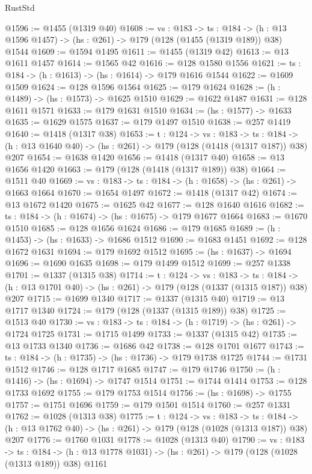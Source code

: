 \begin{lexlean}{RustStd}
\begin{coremodule}
{\begin{coremodule}
{{{{@1596 := @1455 (@1319 @40)
@1608 := {vs : @183} ->
  {ts : @184} -> (h : @13 @1596 @1457) -> (hs : @261) -> @179 (@128 (@1455 (@1319 @189)) @38) @1544
@1609 := @1594 @1495
@1611 := @1455 (@1319 @42)
@1613 := @13 @1611 @1457
@1614 := @1565 @42
@1616 := @128 @1580 @1556
@1621 := {ts : @184} -> (h : @1613) -> (hs : @1614) -> @179 @1616 @1544
@1622 := @1609 @1509
@1624 := @128 @1596 @1564
@1625 := @179 @1624
@1628 := (h : @1489) -> (hs : @1573) -> @1625 @1510
@1629 := @1622 @1487
@1631 := @128 @1611 @1571
@1633 := @179 @1631 @1510
@1634 := (hs : @1577) -> @1633
@1635 := @1629 @1575
@1637 := @179 @1497 @1510
@1638 := @257 @1419
@1640 := @1418 (@1317 @38)
@1653 := {t : @124} ->
  {vs : @183} ->
  {ts : @184} -> (h : @13 @1640 @40) -> (hs : @261) -> @179 (@128 (@1418 (@1317 @187)) @38) @207
@1654 := @1638 @1420
@1656 := @1418 (@1317 @40)
@1658 := @13 @1656 @1420
@1663 := @179 (@128 (@1418 (@1317 @189)) @38)
@1664 := @1511 @40
@1669 := {vs : @183} -> {ts : @184} -> (h : @1658) -> (hs : @261) -> @1663 @1664
@1670 := @1654 @1497
@1672 := @1418 (@1317 @42)
@1674 := @13 @1672 @1420
@1675 := @1625 @42
@1677 := @128 @1640 @1616
@1682 := {ts : @184} -> (h : @1674) -> (hs : @1675) -> @179 @1677 @1664
@1683 := @1670 @1510
@1685 := @128 @1656 @1624
@1686 := @179 @1685
@1689 := (h : @1453) -> (hs : @1633) -> @1686 @1512
@1690 := @1683 @1451
@1692 := @128 @1672 @1631
@1694 := @179 @1692 @1512
@1695 := (hs : @1637) -> @1694
@1696 := @1690 @1635
@1698 := @179 @1499 @1512
@1699 := @257 @1338
@1701 := @1337 (@1315 @38)
@1714 := {t : @124} ->
  {vs : @183} ->
  {ts : @184} -> (h : @13 @1701 @40) -> (hs : @261) -> @179 (@128 (@1337 (@1315 @187)) @38) @207
@1715 := @1699 @1340
@1717 := @1337 (@1315 @40)
@1719 := @13 @1717 @1340
@1724 := @179 (@128 (@1337 (@1315 @189)) @38)
@1725 := @1513 @40
@1730 := {vs : @183} -> {ts : @184} -> (h : @1719) -> (hs : @261) -> @1724 @1725
@1731 := @1715 @1499
@1733 := @1337 (@1315 @42)
@1735 := @13 @1733 @1340
@1736 := @1686 @42
@1738 := @128 @1701 @1677
@1743 := {ts : @184} -> (h : @1735) -> (hs : @1736) -> @179 @1738 @1725
@1744 := @1731 @1512
@1746 := @128 @1717 @1685
@1747 := @179 @1746
@1750 := (h : @1416) -> (hs : @1694) -> @1747 @1514
@1751 := @1744 @1414
@1753 := @128 @1733 @1692
@1755 := @179 @1753 @1514
@1756 := (hs : @1698) -> @1755
@1757 := @1751 @1696
@1759 := @179 @1501 @1514
@1760 := @257 @1331
@1762 := @1028 (@1313 @38)
@1775 := {t : @124} ->
  {vs : @183} ->
  {ts : @184} -> (h : @13 @1762 @40) -> (hs : @261) -> @179 (@128 (@1028 (@1313 @187)) @38) @207
@1776 := @1760 @1031
@1778 := @1028 (@1313 @40)
@1790 := {vs : @183} ->
  {ts : @184} -> (h : @13 @1778 @1031) -> (hs : @261) -> @179 (@128 (@1028 (@1313 @189)) @38) @1161
}}}}
\end{coremodule}}
\end{coremodule}
\end{lexlean}

